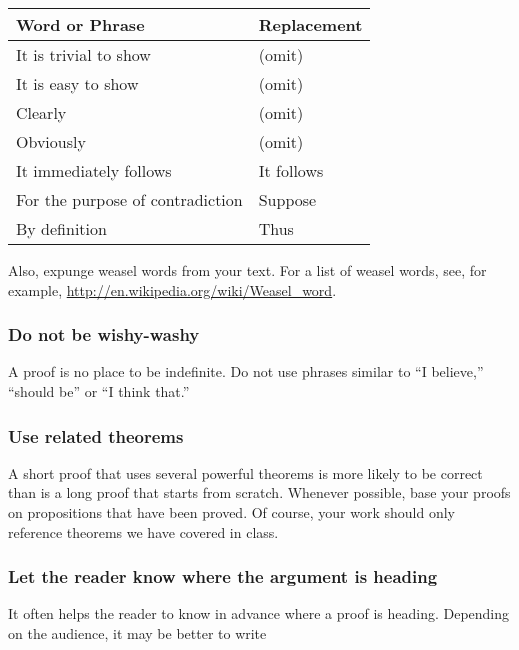\documentclass[12pt]{article}
\newcounter{ex}\setcounter{ex}{0}
\newcounter{se}\setcounter{se}{0}
\begin{document}
\begin{center}
\begin{tabular}{| l l |}
\hline  \textbf {Word or Phrase} &  \textbf {\textbf{Replace}ment} \\ 
\hline
It is trivial to show    & (omit) \\
It is easy to show     & (omit) \\   
Clearly   & (omit) \\
Obviously  & (omit) \\
It immediately follows & It follows \\
For the purpose of contradiction &  Suppose \\
By definition                    & Thus \\
\hline
\end{tabular}
\end{center}
Also, expunge weasel words from your text. For a list of weasel words,  see, for example,  
\url{http://en.wikipedia.org/wiki/Weasel_word}.




 \subsubsection{  Do not be wishy-washy}  

A proof is no place to be indefinite.  Do not use  phrases similar 
to ``I believe,'' ``should be'' or ``I think that.''





 \subsubsection{  Use related theorems}  

A short proof that uses several powerful theorems is more likely to be
correct than is a long proof that starts from scratch.  Whenever
possible, base your proofs on propositions that have been proved.  Of
course, your work should only reference theorems we have covered in class.

 \subsubsection{  Let the reader know where the argument is heading} 

It often helps the reader to know in advance where a proof is heading.
Depending on the audience, it may be better to write
\end{document}
